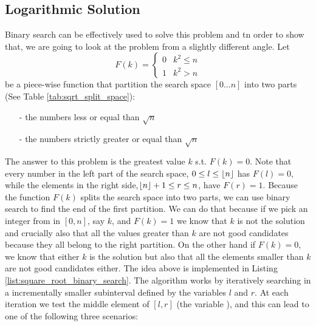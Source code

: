 \begin{minipage}{\linewidth}
	
\end{minipage}

\subsection{Logarithmic Solution}
Binary search can be effectively used to solve this problem and tn order to show that, we are going
to look at the problem from a slightly different angle. Let 
\begin{equation}
	F(k)=\begin{cases} 
	0 & k^2 \leq n \\
	1 & k^2 > n
\end{cases}
\label{eq:square_root_piecewice}
\end{equation} 
be a piece-wise function that partition the search space $[0\ldots n]$ into two parts (See Table
\ref{tab:sqrt_split_space}):
	\begin{itemize}
      \item [-] the numbers  less or equal than $\sqrt{n}$
      \item [-] the numbers strictly greater or equal than $\sqrt{n}$
	\end{itemize}
The answer to this problem is the greatest value $k$ s.t. $F(k) = 0$. 
Note that every number in the left part of the search space, $0 \leq l \leq \lfloor n\rfloor$ has $F(l) = 0$, while the elements in the right side,$\lfloor n\rfloor+1 \leq r \leq n$, have $F(r) = 1$.
Because the function $F(k)$ splits the search space into two parts, we can use
binary search to find the end of the first partition. 
We can do that because if we pick an integer from in $[0,n]$, say $k$, and $F(k) = 1$ we know that $k$ is not the solution and crucially also that
all the values greater than $k$ are not good candidates because they all belong to the right partition.
On the other hand if $F(k) = 0$, we know that either $k$ is the solution but also that all the elements smaller than $k$ are not good candidates either.
The idea above is implemented in Listing \ref{list:square_root_binary_search}. 
The algorithm works by iteratively searching in a
incrementally smaller subinterval defined by the variables $l$ and $r$. 
At each iteration we test the middle element of $[l,r]$ (the variable ), and this can lead to one of the following three scenarios:

